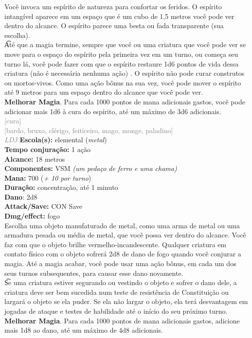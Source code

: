 \documentclass{RPG_Adventure}[2021/10/20]
\begin{document}
{\normalsize Você invoca um espírito de natureza para confortar os feridos. O espírito intangível aparece em um espaço que é um cubo de 1,5 metros você pode ver dentro do alcance. O espírito parece uma besta ou fada transparente (sua escolha).\\\t Até que a magia termine, sempre que você ou uma criatura que você pode ver se move para o espaço do espírito pela primeira vez em um turno, ou começa seu turno lá, você pode fazer com que o espírito restaure 1d6 pontos de vida dessa criatura (não é necessária nenhuma ação) . O espírito não pode curar construtos ou mortos-vivos. Como uma ação bônus na sua vez, você pode mover o espírito até 9 metros para um espaço dentro do alcance que você pode ver.\\\t \textbf{Melhorar Magia}. Para cada 1000 pontos de mana adicionais gastos, você pode adicionar mais 1d6 à cura do espírito, até um máximo de 3d6 adicionais.\\}
{\scriptsize \textcolor{gray}{[cura]\\}}
{\scriptsize \textcolor{gray}{[bardo, bruxo, clérigo, feiticeiro, mago, monge, paladino]\\}}
{\tiny \textcolor{gray}{\textit{LDJ}}}
{\small \t \textbf{Escola(s):} elemental (\textit{metal})\\\t \textbf{Tempo conjuração:} 1 ação\\\t \textbf{Alcance:} 18 metros\\\t \textbf{Componentes:} VSM \textit{(um pedaço de ferro e uma chama)}\\\t \textbf{Mana:} 700 (\textit{+ 10 por turno})\\\t \textbf{Duração:} concentração, até 1 minuto\\\t \textbf{Dano}: 2d8\\\t \textbf{Attack/Save:} CON Save\\\t \textbf{Dmg/effect:} fogo\\}
{\normalsize Escolha uma objeto manufaturado de metal, como uma arma de metal ou uma armadura pesada ou média de metal, que você possa ver dentro do alcance. Você faz com que o objeto brilhe vermelho-incandescente. Qualquer criatura em contato físico com o objeto sofrerá 2d8 de dano de fogo quando você conjurar a magia. Até a magia acabar, você pode usar uma ação bônus, em cada um dos seus turnos subsequentes, para causar esse dano novamente.\\\t Se uma criatura estiver segurando ou vestindo o objeto e sofrer o dano dele, a criatura deve ser bem sucedida num teste de resistência de Constituição ou largará o objeto se ela puder. Se ela não largar o objeto, ela terá desvantagem em jogadas de ataque e testes de habilidade até o início do seu próximo turno.\\\t \textbf{Melhorar Magia}. Para cada 1000 pontos de mana adicionais gastos, adicione mais 1d8 ao dano, até um máximo de 4d8 adicionais.\\}
\end{document}

